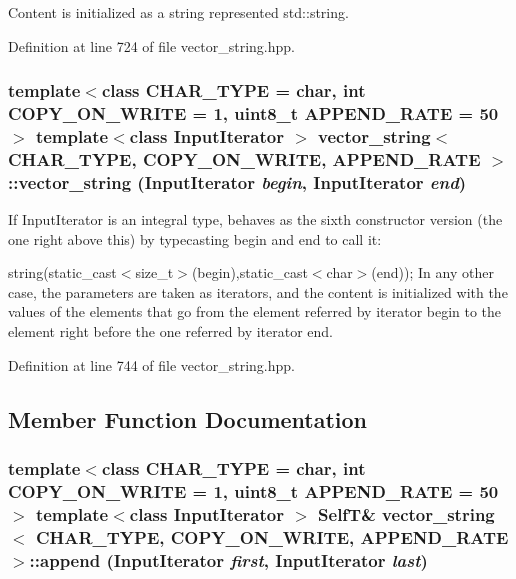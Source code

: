 Content is initialized as a string represented std::string. 

Definition at line 724 of file vector\_\-string.hpp.\hypertarget{classvector__string_846b1252f511e36c8209c7122f66fb7c}{
\subsubsection[{vector\_\-string}]{\setlength{\rightskip}{0pt plus 5cm}template$<$class CHAR\_\-TYPE  = char, int COPY\_\-ON\_\-WRITE = 1, uint8\_\-t APPEND\_\-RATE = 50$>$ template$<$class InputIterator $>$ {\bf vector\_\-string}$<$ CHAR\_\-TYPE, COPY\_\-ON\_\-WRITE, APPEND\_\-RATE $>$::{\bf vector\_\-string} (InputIterator {\em begin}, \/  InputIterator {\em end})}}
\label{classvector__string_846b1252f511e36c8209c7122f66fb7c}


If InputIterator is an integral type, behaves as the sixth constructor version (the one right above this) by typecasting begin and end to call it:

string(static\_\-cast$<$size\_\-t$>$(begin),static\_\-cast$<$char$>$(end)); In any other case, the parameters are taken as iterators, and the content is initialized with the values of the elements that go from the element referred by iterator begin to the element right before the one referred by iterator end. 

Definition at line 744 of file vector\_\-string.hpp.

\subsection{Member Function Documentation}
\hypertarget{classvector__string_cd86d82c4f9a8f2260d09e0fc22ad073}{
\subsubsection[{append}]{\setlength{\rightskip}{0pt plus 5cm}template$<$class CHAR\_\-TYPE  = char, int COPY\_\-ON\_\-WRITE = 1, uint8\_\-t APPEND\_\-RATE = 50$>$ template$<$class InputIterator $>$ {\bf SelfT}\& {\bf vector\_\-string}$<$ CHAR\_\-TYPE, COPY\_\-ON\_\-WRITE, APPEND\_\-RATE $>$::append (InputIterator {\em first}, \/  InputIterator {\em last})}}
\label{classvector__string_cd86d82c4f9a8f2260d09e0fc22ad073}



